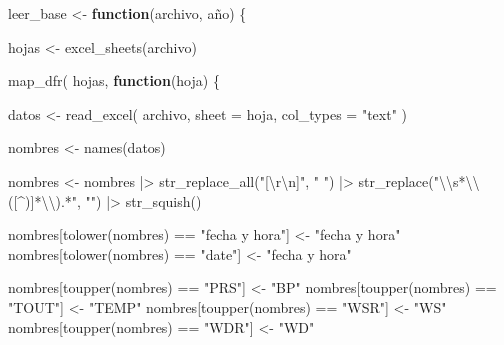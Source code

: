 \documentclass[
  letterpaper,
  DIV=11,
  numbers=noendperiod]{scrartcl}
\newenvironment{Shaded}{\begin{snugshade}}{\end{snugshade}}
\newcommand{\AttributeTok}[1]{\textcolor[rgb]{0.40,0.45,0.13}{#1}}
\newcommand{\ControlFlowTok}[1]{\textcolor[rgb]{0.00,0.23,0.31}{\textbf{#1}}}
\newcommand{\FunctionTok}[1]{\textcolor[rgb]{0.28,0.35,0.67}{#1}}
\newcommand{\NormalTok}[1]{\textcolor[rgb]{0.00,0.23,0.31}{#1}}
\newcommand{\OtherTok}[1]{\textcolor[rgb]{0.00,0.23,0.31}{#1}}
\newcommand{\SpecialCharTok}[1]{\textcolor[rgb]{0.37,0.37,0.37}{#1}}
\newcommand{\StringTok}[1]{\textcolor[rgb]{0.13,0.47,0.30}{#1}}
\begin{document}
\begin{Shaded}
\begin{Highlighting}[]
\NormalTok{leer\_base }\OtherTok{\textless{}{-}} \ControlFlowTok{function}\NormalTok{(archivo, año) \{}
  
\NormalTok{  hojas }\OtherTok{\textless{}{-}} \FunctionTok{excel\_sheets}\NormalTok{(archivo)}
  
  \FunctionTok{map\_dfr}\NormalTok{(}
\NormalTok{    hojas,}
    \ControlFlowTok{function}\NormalTok{(hoja) \{}
      
\NormalTok{      datos }\OtherTok{\textless{}{-}} \FunctionTok{read\_excel}\NormalTok{(}
\NormalTok{        archivo,}
        \AttributeTok{sheet =}\NormalTok{ hoja,}
        \AttributeTok{col\_types =} \StringTok{"text"}
\NormalTok{      )}
      
\NormalTok{      nombres }\OtherTok{\textless{}{-}} \FunctionTok{names}\NormalTok{(datos)}
      
\NormalTok{      nombres }\OtherTok{\textless{}{-}}\NormalTok{ nombres }\SpecialCharTok{|\textgreater{}}
        \FunctionTok{str\_replace\_all}\NormalTok{(}\StringTok{"[}\SpecialCharTok{\textbackslash{}r\textbackslash{}n}\StringTok{]"}\NormalTok{, }\StringTok{" "}\NormalTok{) }\SpecialCharTok{|\textgreater{}}
        \FunctionTok{str\_replace}\NormalTok{(}\StringTok{"}\SpecialCharTok{\textbackslash{}\textbackslash{}}\StringTok{s*}\SpecialCharTok{\textbackslash{}\textbackslash{}}\StringTok{([\^{})]*}\SpecialCharTok{\textbackslash{}\textbackslash{}}\StringTok{).*"}\NormalTok{, }\StringTok{""}\NormalTok{) }\SpecialCharTok{|\textgreater{}}
        \FunctionTok{str\_squish}\NormalTok{()}

\NormalTok{      nombres[}\FunctionTok{tolower}\NormalTok{(nombres) }\SpecialCharTok{==} \StringTok{"fecha y hora"}\NormalTok{] }\OtherTok{\textless{}{-}} \StringTok{"fecha y hora"}
\NormalTok{      nombres[}\FunctionTok{tolower}\NormalTok{(nombres) }\SpecialCharTok{==} \StringTok{"date"}\NormalTok{] }\OtherTok{\textless{}{-}} \StringTok{"fecha y hora"}

      
\NormalTok{      nombres[}\FunctionTok{toupper}\NormalTok{(nombres) }\SpecialCharTok{==} \StringTok{"PRS"}\NormalTok{] }\OtherTok{\textless{}{-}} \StringTok{"BP"}
\NormalTok{      nombres[}\FunctionTok{toupper}\NormalTok{(nombres) }\SpecialCharTok{==} \StringTok{"TOUT"}\NormalTok{] }\OtherTok{\textless{}{-}} \StringTok{"TEMP"}
\NormalTok{      nombres[}\FunctionTok{toupper}\NormalTok{(nombres) }\SpecialCharTok{==} \StringTok{"WSR"}\NormalTok{] }\OtherTok{\textless{}{-}} \StringTok{"WS"}
\NormalTok{      nombres[}\FunctionTok{toupper}\NormalTok{(nombres) }\SpecialCharTok{==} \StringTok{"WDR"}\NormalTok{] }\OtherTok{\textless{}{-}} \StringTok{"WD"}
      

\end{Highlighting}
\end{Shaded}
\end{document}
